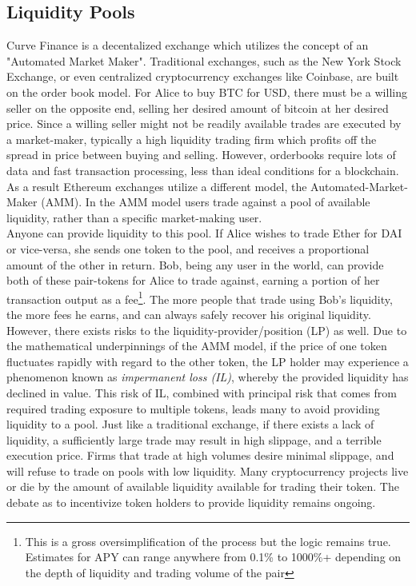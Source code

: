 \documentclass{article}
\begin{document}
\subsection{Liquidity Pools}

Curve Finance is a decentalized exchange which utilizes the concept of an "Automated Market Maker". Traditional exchanges, such as the New York Stock Exchange, or even centralized cryptocurrency exchanges like Coinbase, are built on the order book model. For Alice to buy BTC for USD, there must be a willing seller on the opposite end, selling her desired amount of bitcoin at her desired price. Since a willing seller might not be readily available trades are executed by a market-maker, typically a high liquidity trading firm which profits off the spread in price between buying and selling. However, orderbooks require lots of data and fast transaction processing, less than ideal conditions for a blockchain. As a result Ethereum exchanges utilize a different model, the Automated-Market-Maker (AMM). In the AMM model users trade against a pool of available liquidity, rather than a specific market-making user.\\

Anyone can provide liquidity to this pool. If Alice wishes to trade Ether for DAI or vice-versa, she sends one token to the pool, and receives a proportional amount of the other in return. Bob, being any user in the world, can provide both of these pair-tokens for Alice to trade against, earning a portion of her transaction output as a fee\footnote{This is a gross oversimplification of the process but the logic remains true. Estimates for APY can range anywhere from 0.1\% to 1000\%+ depending on the depth of liquidity and trading volume of the pair}. The more people that trade using Bob's liquidity, the more fees he earns, and can always safely recover his original liquidity. However, there exists risks to the liquidity-provider/position (LP) as well. Due to the mathematical underpinnings of the AMM model, if the price of one token fluctuates rapidly with regard to the other token, the LP holder may experience a phenomenon known as \emph{impermanent loss (IL)}, whereby the provided liquidity has declined in value. This risk of IL, combined with principal risk that comes from required trading exposure to multiple tokens, leads many to avoid providing liquidity to a pool. Just like a traditional exchange, if there exists a lack of liquidity, a sufficiently large trade may result in high slippage, and a terrible execution price. Firms that trade at high volumes desire minimal slippage, and will refuse to trade on pools with low liquidity. Many cryptocurrency projects live or die by the amount of available liquidity available for trading their token. The debate as to incentivize token holders to provide liquidity remains ongoing.\\
\end{document}
